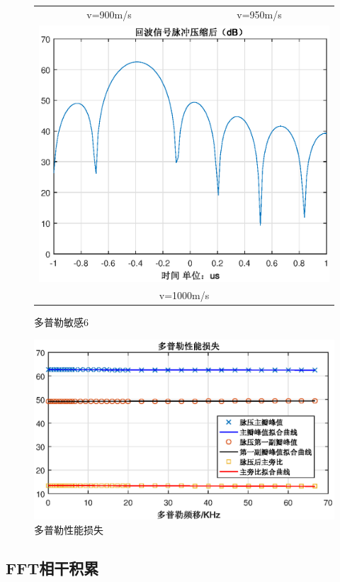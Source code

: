 \documentclass[12pt]{article}
\begin{document}
\begin{figure}[htbp]
\begin{tabular}{cc}
    v=900m/s&v=950m/s\\
  \multicolumn{2}{c}{\includegraphics[width=.5\textwidth]{Doppler_sensitivity_1000}}\\
   \multicolumn{2}{c}{v=1000m/s}\\
  \end{tabular}
  \caption{多普勒敏感6}\label{Doppler_sensitivity_0006}
\end{figure}
\begin{figure}[htbp]
  \centering
  \includegraphics[width=\textwidth]{Doppler_tolerance}
  \caption{多普勒性能损失}\label{Doppler_tolerance}
\end{figure}
\subsection{FFT相干积累}
\end{document}
